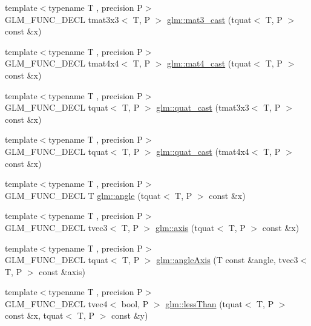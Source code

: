 \begin{DoxyCompactItemize}
\item 
{\footnotesize template$<$typename T , precision P$>$ }\\G\+L\+M\+\_\+\+F\+U\+N\+C\+\_\+\+D\+E\+C\+L tmat3x3$<$ T, P $>$ \hyperlink{group__gtc__quaternion_gae04c39422eb4e450ec8c4f45a1057b40}{glm\+::mat3\+\_\+cast} (tquat$<$ T, P $>$ const \&x)
\item 
{\footnotesize template$<$typename T , precision P$>$ }\\G\+L\+M\+\_\+\+F\+U\+N\+C\+\_\+\+D\+E\+C\+L tmat4x4$<$ T, P $>$ \hyperlink{group__gtc__quaternion_ga14bb2ddf028c91542763eb6f2bba47ef}{glm\+::mat4\+\_\+cast} (tquat$<$ T, P $>$ const \&x)
\item 
{\footnotesize template$<$typename T , precision P$>$ }\\G\+L\+M\+\_\+\+F\+U\+N\+C\+\_\+\+D\+E\+C\+L tquat$<$ T, P $>$ \hyperlink{group__gtc__quaternion_ga950f8acff3e33bbda77895a3dcb7e5ce}{glm\+::quat\+\_\+cast} (tmat3x3$<$ T, P $>$ const \&x)
\item 
{\footnotesize template$<$typename T , precision P$>$ }\\G\+L\+M\+\_\+\+F\+U\+N\+C\+\_\+\+D\+E\+C\+L tquat$<$ T, P $>$ \hyperlink{group__gtc__quaternion_ga3e4615e9884dd0f41f5617b9848a5d9c}{glm\+::quat\+\_\+cast} (tmat4x4$<$ T, P $>$ const \&x)
\item 
{\footnotesize template$<$typename T , precision P$>$ }\\G\+L\+M\+\_\+\+F\+U\+N\+C\+\_\+\+D\+E\+C\+L T \hyperlink{group__gtc__quaternion_gad4a4448baedb198b2b1e7880d2544dc9}{glm\+::angle} (tquat$<$ T, P $>$ const \&x)
\item 
{\footnotesize template$<$typename T , precision P$>$ }\\G\+L\+M\+\_\+\+F\+U\+N\+C\+\_\+\+D\+E\+C\+L tvec3$<$ T, P $>$ \hyperlink{group__gtc__quaternion_ga0b3e87a13b2708154b72259e50789a19}{glm\+::axis} (tquat$<$ T, P $>$ const \&x)
\item 
{\footnotesize template$<$typename T , precision P$>$ }\\G\+L\+M\+\_\+\+F\+U\+N\+C\+\_\+\+D\+E\+C\+L tquat$<$ T, P $>$ \hyperlink{group__gtc__quaternion_ga37ae19405f1ccf766f27e4fcd035d859}{glm\+::angle\+Axis} (T const \&angle, tvec3$<$ T, P $>$ const \&axis)
\item 
{\footnotesize template$<$typename T , precision P$>$ }\\G\+L\+M\+\_\+\+F\+U\+N\+C\+\_\+\+D\+E\+C\+L tvec4$<$ bool, P $>$ \hyperlink{group__gtc__quaternion_ga91a40d16a3b5bb47d71ac1a3fb688ffa}{glm\+::less\+Than} (tquat$<$ T, P $>$ const \&x, tquat$<$ T, P $>$ const \&y)

\end{DoxyCompactItemize}
